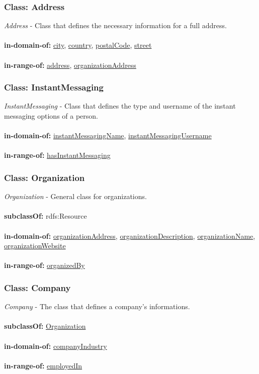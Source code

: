 \documentclass[a4paper,12pt]{article}
\numberwithin{equation}{section}
\begin{document}
\subsubsection{Class: Address}\hypertarget{Address}{}
\textit{Address} - Class that defines the necessary information for a full address.
\\\\
\textbf{in-domain-of:} \hyperlink{city}{city}, \hyperlink{country}{country}, \hyperlink{postalCode}{postalCode}, \hyperlink{street}{street}
\\\\
\textbf{in-range-of:} \hyperlink{address}{address}, \hyperlink{organizationAddress}{organizationAddress}

\subsubsection{Class: InstantMessaging}\hypertarget{InstantMessaging}{}
\textit{InstantMessaging} - Class that defines the type and username of the instant messaging options of a person.
\\\\
\textbf{in-domain-of:} \hyperlink{instantMessagingName}{instantMessagingName}, \hyperlink{instantMessagingUsername}{instantMessagingUsername}
\\\\
\textbf{in-range-of:} \hyperlink{hasInstantMessaging}{hasInstantMessaging}

\subsubsection{Class: Organization}\hypertarget{Organization}{}
\textit{Organization} - General class for organizations.
\\\\
\textbf{subclassOf:} rdfs:Resource
\\\\
\textbf{in-domain-of:} \hyperlink{organizationAddress}{organizationAddress}, \hyperlink{organizationDescription}{organizationDescription}, \hyperlink{organizationName}{organizationName}, \hyperlink{organizationWebsite}{organizationWebsite}
\\\\
\textbf{in-range-of:} \hyperlink{organizedBy}{organizedBy}

\subsubsection{Class: Company}\hypertarget{Company}{}
\textit{Company} - The class that defines a company's informations.
\\\\
\textbf{subclassOf:} \hyperlink{Organization}{Organization}
\\\\
\textbf{in-domain-of:} \hyperlink{companyIndustry}{companyIndustry}
\\\\
\textbf{in-range-of:} \hyperlink{employedIn}{employedIn}
\end{document}
